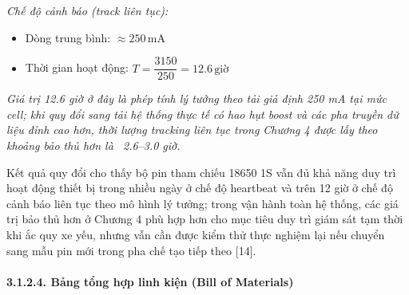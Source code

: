 \documentclass[a4paper]{extarticle}
\providecommand{\tightlist}{%
  \setlength{\itemsep}{0pt}\setlength{\parskip}{0pt}}
\begin{document}
\emph{Chế độ cảnh báo (track liên tục):}

\begin{itemize}
\tightlist
\item
  Dòng trung bình: \(\approx 250\,\mathrm{mA}\)
\item
  Thời gian hoạt động:
  \(T = \dfrac{3150}{250} = 12.6\,\mathrm{giờ}\)
\end{itemize}

\emph{Giá trị 12.6 giờ ở đây là phép tính lý tưởng theo tải giả định 250
mA tại mức cell; khi quy đổi sang tải hệ thống thực tế có hao hụt boost
và các pha truyền dữ liệu đỉnh cao hơn, thời lượng tracking liên tục
trong Chương 4 được lấy theo khoảng bảo thủ hơn là
~2.6--3.0 giờ.}

Kết quả quy đổi cho thấy bộ pin tham chiếu 18650 1S vẫn đủ khả năng duy trì
hoạt động thiết bị trong nhiều ngày ở chế độ heartbeat và trên 12 giờ ở
chế độ cảnh báo liên tục theo mô hình lý tưởng; trong vận hành toàn hệ
thống, các giá trị bảo thủ hơn ở Chương 4 phù hợp hơn cho mục tiêu duy
trì giám sát tạm thời khi ắc quy xe yếu, nhưng vẫn cần được kiểm thử
thực nghiệm lại nếu chuyển sang mẫu pin mới trong pha chế tạo tiếp theo
{[}14{]}.

\paragraph{3.1.2.4. Bảng tổng hợp linh kiện (Bill of
Materials)}\label{3214-bux1ea3ng-tux1ed5ng-hux1ee3p-linh-kiux1ec7n-bill-of-materials}
\end{document}
